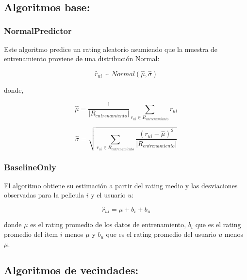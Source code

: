 \documentclass{article}
\begin{document}
\\

\subsection{Algoritmos base:}

\subsubsection{NormalPredictor}

Este algoritmo predice un rating aleatorio asumiendo que la muestra de entrenamiento proviene de una distribución Normal:

\begin{equation}
    \hat r_{ui}\sim Normal(\hat \mu, \hat \sigma)
\end{equation}

donde,

\begin{equation}
\hat \mu = \frac{1}{|R_{entrenamiento}|}\sum_{r_{ui} \in R_{entrenamiento}} r_{ui}
\end{equation}

\begin{equation}
\hat \sigma= \sqrt{\sum_{r_{ui} \in R_{entrenamiento}} \frac{(r_{ui}-\hat \mu)^2}{|R_{entrenamiento}|}}
\end{equation}


\subsubsection{BaselineOnly}

El algoritmo obtiene su estimación a partir del rating medio y las desviaciones observadas para la pelicula $i$ y el usuario $u$:

\begin{equation}
\hat r_{ui}= \mu + b_i + b_u
\end{equation}

donde $\mu$ es el rating promedio de los datos de entrenamiento, $b_i$ que es el rating promedio del item $i$ menos $\mu$ y $b_u$ que es el rating promedio del usuario $u$ menos $\mu$.


\subsection{Algoritmos de vecindades:}
\end{document}
